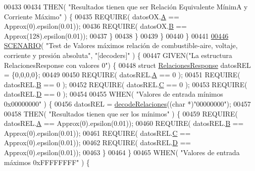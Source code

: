 \begin{DoxyCode}
{00433 
00434             THEN( \textcolor{stringliteral}{"Resultados tienen que ser Relación Equivalente MínimA y Corriente Máximo"} ) \{
00435                 REQUIRE( datosOX.\hyperlink{structOxigenoResponse_a068c403e5746226cf22bb020b4c786d3}{A} == Approx(0).epsilon(0.01));
00436                 REQUIRE( datosOX.\hyperlink{structOxigenoResponse_a96b19152dd001e19d1351e2d97f22736}{B} == Approx(128).epsilon(0.01));
00437             \}
00438         \}
00439     \}
00440 \}
00441 
\hyperlink{UnitTestCase_8cpp_a40a3028fa1222aa3915042e8d9c0c4d2}{00446} \hyperlink{UnitTestCase_8cpp_aa6afb62ebdd4c3e07996c995f623eb6b}{SCENARIO}( \textcolor{stringliteral}{"Test de Valores máximos relación de combustible-aire, voltaje, corriente y presión
       absoluta"}, \textcolor{stringliteral}{"[decoders]"} ) \{
00447     GIVEN(\textcolor{stringliteral}{"La estructura RelacionesResponse con valores 0"}) \{
00448         \textcolor{keyword}{struct }\hyperlink{structRelacionesResponse}{RelacionesResponse} datosREL = \{0,0,0,0\};
00449 
00450         REQUIRE( datosREL.\hyperlink{structRelacionesResponse_a560d1e6af01b999625b467ef3f858181}{A} == 0 );
00451         REQUIRE( datosREL.\hyperlink{structRelacionesResponse_a1216f6019af393dd85853f352533ed9d}{B} == 0 );
00452         REQUIRE( datosREL.\hyperlink{structRelacionesResponse_a37feda02f128b77f4f2d61cabcddc9e7}{C} == 0 );
00453         REQUIRE( datosREL.\hyperlink{structRelacionesResponse_ab76f55b12df3754a9bb5b102a1c06cbc}{D} == 0 );
00454 
00455         WHEN( \textcolor{stringliteral}{"Valores de entrada mínimos 0x00000000"} ) \{
00456             datosREL = \hyperlink{decoders_8cpp_a88d7079325bf81705583d9f2101cfa15}{decodeRelaciones}((\textcolor{keywordtype}{char} *)\textcolor{stringliteral}{"00000000"});
00457 
00458             THEN( \textcolor{stringliteral}{"Resultados tienen que ser los mínimos"} ) \{
00459                 REQUIRE( datosREL.\hyperlink{structRelacionesResponse_a560d1e6af01b999625b467ef3f858181}{A} == Approx(0).epsilon(0.01));
00460                 REQUIRE( datosREL.\hyperlink{structRelacionesResponse_a1216f6019af393dd85853f352533ed9d}{B} == Approx(0).epsilon(0.01));
00461                 REQUIRE( datosREL.\hyperlink{structRelacionesResponse_a37feda02f128b77f4f2d61cabcddc9e7}{C} == Approx(0).epsilon(0.01));
00462                 REQUIRE( datosREL.\hyperlink{structRelacionesResponse_ab76f55b12df3754a9bb5b102a1c06cbc}{D} == Approx(0).epsilon(0.01));
00463             \}
00464         \}
00465         WHEN( \textcolor{stringliteral}{"Valores de entrada máximos 0xFFFFFFFF"} ) \{
}
\end{DoxyCode}

